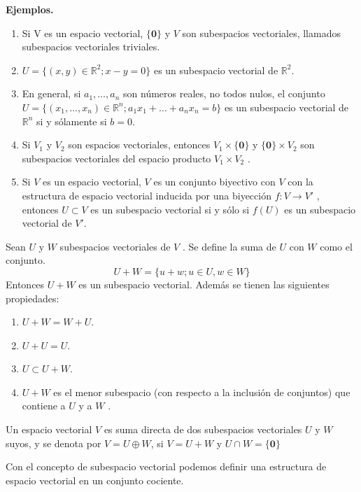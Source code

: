 	    \textbf{Ejemplos.}%
		\begin{enumerate}
			\item Si V es un espacio vectorial, $\{\mathbf{0}\}$ y $V$ son subespacios vectoriales, llamados
			subespacios vectoriales triviales. 
			\item $ U = \{(x, y) \in{\mathbb{R}^{2}} ; x - y = 0\}$ es un subespacio vectorial de $\mathbb{R}^{2}$.
			\item  En general, si $a_{1} ,\ldots , a_{n}$ son números reales, no todos nulos, el conjunto $ U =\{(x_{1} ,\ldots , x_{n} ) \in{\mathbb{R}^{n}} ; a_{1} x_{1} +\ldots + a_{n} x_{n} = b\}$ es un subespacio vectorial de $\mathbb{R}^{n}$ si y sólamente si $b = 0$.
			\item Si $V_{1} $ y $V_{2}$ son espacios vectoriales, entonces $V_{1}\times{} $$\{\mathbf{0}\}$ y $\{\mathbf{0}\}\times{}V_{2}$ son subespacios vectoriales del espacio producto $V_{1} \times{} V_{2}$ .	
			\item Si $V$ es un espacio vectorial, $V$ es un conjunto biyectivo con $V$ con la estructura de espacio vectorial inducida por una biyección $f:V \rightarrow V'$ , entonces $U \subset V$
			es un subespacio vectorial si y sólo si $f(U)$ es un subespacio vectorial de $V'$.	
		\end{enumerate}
		\begin{defi}
			Sean $ U $ y $ W $ subespacios vectoriales de $ V $ . Se define la suma de $ U $ con $ W $ como el conjunto.
			\[ U + W = \{u+w; u \in{U}, w \in{W}\}\]
			Entonces $ U+W $ es un subespacio vectorial. Además se tienen las siguientes propiedades:
			\begin{enumerate}
				\item $U + W = W + U$.
				\item $U + U = U$.
				\item $U \subset U + W$.
				\item $U + W$ es el menor subespacio (con respecto a la inclusión de conjuntos) que	contiene a $U$ y a $W$ .
				
			\end{enumerate}
		\end{defi}
		\begin{defi}
			Un espacio vectorial $V$ es suma directa de dos subespacios vectoriales $U$ y $W$ suyos, y se denota por $V = U \oplus W$, si $V = U + W$ y $U \cap W = \{\mathbf{0}\}$
		\end{defi}
		Con el concepto de subespacio vectorial podemos definir una estructura de espacio vectorial en un conjunto cociente.
